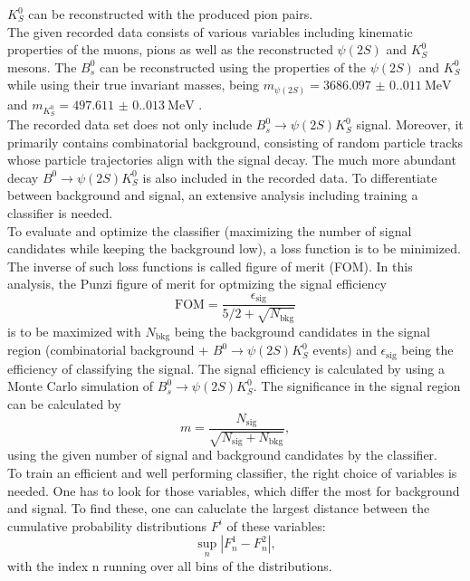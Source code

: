 $K_S^0$ can be reconstructed with the produced pion pairs.\\
The given recorded data consists of various variables including kinematic properties of the muons, pions as well as the reconstructed $\psi (2S)$ and $K_S^0$ mesons. The $B_s^0$ can be reconstructed using the
properties of the $\psi (2S)$ and $K_S^0$ while using their true invariant masses, being $m_{\psi (2S)} = \qty{3686.097(0.011)}{\mega\electronvolt}$ and $m_{K_S^0} = \qty{497.611(0.013)}{\mega\electronvolt}$ \cite{PDG}.\\
The recorded data set does not only include $B_s^0 \to \psi (2S)K_S^0$ signal. Moreover, it primarily contains combinatorial background, consisting of random particle tracks whose particle trajectories align with the
signal decay. The much more abundant decay $B^0 \to \psi (2S)K_S^0$ is also included in the recorded data. To differentiate between background and signal, an extensive analysis including
training a classifier is needed.\\
To evaluate and optimize the classifier (maximizing the number of signal candidates while keeping the background low), a loss function is to be minimized. The inverse of such loss functions is called figure of merit (FOM).
In this analysis, the Punzi figure of merit for optmizing the signal efficiency
\begin{equation}
    \label{eq:FOM}
    \mathrm{FOM}  = \frac{\epsilon_{\mathrm{sig}}}{5/2 + \sqrt{N_{\mathrm{bkg}}}}
\end{equation}
is to be maximized with $N_{\mathrm{bkg}}$ being the background candidates in the signal region (combinatorial background + $B^0 \to \psi (2S)K_S^0$ events) and $\epsilon_{\mathrm{sig}}$ being the efficiency of classifying
the signal. The signal efficiency is calculated by using a Monte Carlo simulation of $B_s^0 \to \psi (2S)K_S^0$. The significance in the signal region can be calculated by
\begin{equation}
    \label{eq:sign}
    m = \frac{N_{\mathrm{sig}}}{\sqrt{N_{\mathrm{sig}} + N_{\mathrm{bkg}}}},
\end{equation}
using the given number of signal and background candidates by the classifier.\\
To train an efficient and well performing classifier, the right choice of variables is needed. One has to look for those variables, which differ the most for background and signal. To find these, one can caluclate the 
largest distance between the cumulative probability distributions $F^i$ of these variables:
\begin{equation}
    \label{eq:Kolmogorov}
    \sup\limits_{n} | F_n^1 - F_n^2 |,
\end{equation}
with the index n running over all bins of the distributions. 